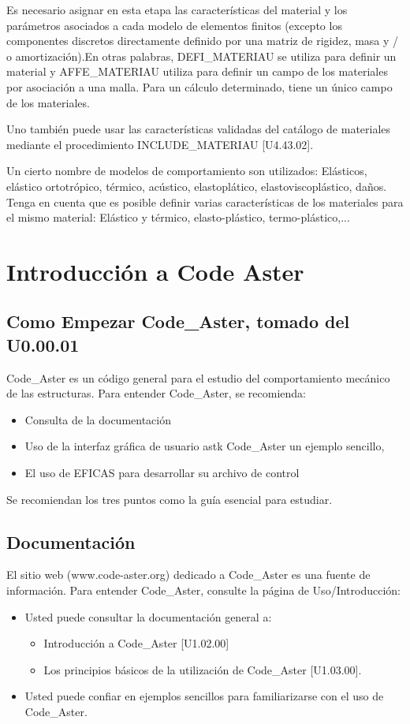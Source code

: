 \documentclass[12pt]{book}
\theoremstyle{definition}
\theoremstyle{remark}
\theoremstyle{plain}
\begin{document}
Es necesario asignar en esta etapa las características del material y
 los parámetros asociados a cada modelo de elementos finitos (excepto los 
componentes discretos directamente definido por una matriz de rigidez, 
masa y / o amortización).En otras palabras, DEFI_MATERIAU se utiliza 
para definir un material y AFFE_MATERIAU utiliza para definir un campo de 
los materiales por asociación a  una malla. Para un cálculo determinado, 
tiene un único campo de los materiales.

Uno también puede usar las características validadas del 
catálogo de materiales mediante el procedimiento INCLUDE_MATERIAU [U4.43.02].

Un cierto nombre de modelos de comportamiento son utilizados:
Elásticos, elástico ortotrópico, térmico, acústico, elastoplático,
elastoviscoplástico, daños. Tenga en cuenta que es posible definir varias 
características de los materiales para el mismo material: Elástico y térmico,
elasto-plástico, termo-plástico,... 

\chapter{Introducción a Code Aster}

\section{Como Empezar Code\_Aster, tomado del U0.00.01}
Code\_Aster es un código general para el estudio del comportamiento mecánico de 
las estructuras.
Para entender Code\_Aster, se recomienda:
\begin{itemize}
 \item Consulta de la documentación
 \item Uso de la interfaz gráfica de usuario astk Code\_Aster un ejemplo sencillo,
 \item El uso de EFICAS para desarrollar su archivo de control
\end{itemize}


Se recomiendan los tres puntos como la guía esencial para estudiar.
\section{Documentación}

El sitio web (www.code-aster.org) dedicado a  Code\_Aster es una fuente de información.
Para entender Code\_Aster, consulte la página de Uso/Introducción:
\begin{itemize}
 \item Usted puede consultar la documentación general a: 
     \begin{itemize}
       \item Introducción a Code\_Aster [U1.02.00] 
       \item  Los principios básicos de la utilización de Code\_Aster [U1.03.00]. 
     \end{itemize}
 \item Usted puede confiar en ejemplos sencillos para familiarizarse con el uso 
de Code\_Aster.
\end{itemize}
\end{document}
